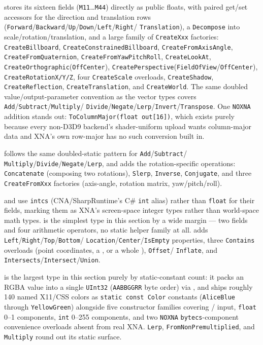  stores its sixteen fields (\texttt{M11}\dots\texttt{M44}) directly as public
floats, with paired get/set accessors for the direction and translation rows
(\texttt{Forward}/\texttt{Backward}/\texttt{Up}/\texttt{Down}/\texttt{Left}/\texttt{Right}/%
\texttt{Translation}), a \texttt{Decompose} into scale/rotation/translation, and a large family
of \texttt{CreateXxx} factories: \texttt{CreateBillboard}, \texttt{CreateConstrainedBillboard},
\texttt{CreateFromAxisAngle}, \texttt{CreateFromQuaternion}, \texttt{CreateFromYawPitchRoll},
\texttt{CreateLookAt}, \texttt{CreateOrthographic}(\texttt{OffCenter}),
\texttt{CreatePerspective}(\texttt{FieldOfView}/\texttt{OffCenter}), \texttt{CreateRotationX/Y/Z},
four \texttt{CreateScale} overloads, \texttt{CreateShadow}, \texttt{CreateReflection},
\texttt{CreateTranslation}, and \texttt{CreateWorld}. The same doubled value/output-parameter
convention as the vector types covers \texttt{Add}/\texttt{Subtract}/\texttt{Multiply}/%
\texttt{Divide}/\texttt{Negate}/\texttt{Lerp}/\texttt{Invert}/\texttt{Transpose}. One
\texttt{NOXNA} addition stands out: \texttt{ToColumnMajor(float out[16])}, which exists purely
because every non-D3D9 backend's shader-uniform upload wants column-major data and XNA's own
row-major  has no such conversion built in.

 follows the same doubled-static pattern for \texttt{Add}/\texttt{Subtract}/%
\texttt{Multiply}/\texttt{Divide}/\texttt{Negate}/\texttt{Lerp}, and adds the rotation-specific
operations: \texttt{Concatenate} (composing two rotations), \texttt{Slerp}, \texttt{Inverse},
\texttt{Conjugate}, and three \texttt{CreateFromXxx} factories (axis-angle, rotation matrix,
yaw/pitch/roll).

 and  use \texttt{intcs} (CNA/SharpRuntime's C\# \texttt{int}
alias) rather than \texttt{float} for their fields, marking them as XNA's screen-space integer
types rather than world-space math types.  is the simplest type in this section
by a wide margin --- two fields and four arithmetic operators, no static helper family at all.
 adds \texttt{Left}/\texttt{Right}/\texttt{Top}/\texttt{Bottom}/%
\texttt{Location}/\texttt{Center}/\texttt{IsEmpty} properties, three \texttt{Contains} overloads
(point coordinates, a , or a whole ), \texttt{Offset}/%
\texttt{Inflate}, and \texttt{Intersects}/\texttt{Intersect}/\texttt{Union}.

 is the largest type in this section purely by static-constant count: it packs
an RGBA value into a single \texttt{UInt32} (\texttt{AABBGGRR} byte order) via
, and ships roughly 140 named X11/CSS colors as \texttt{static
const Color} constants (\texttt{AliceBlue} through \texttt{YellowGreen}) alongside five
constructor families covering / input, \texttt{float}
0--1 components, \texttt{int} 0--255 components, and two \texttt{NOXNA} \texttt{bytecs}-component
convenience overloads absent from real XNA. \texttt{Lerp}, \texttt{FromNonPremultiplied}, and
\texttt{Multiply} round out its static surface.

